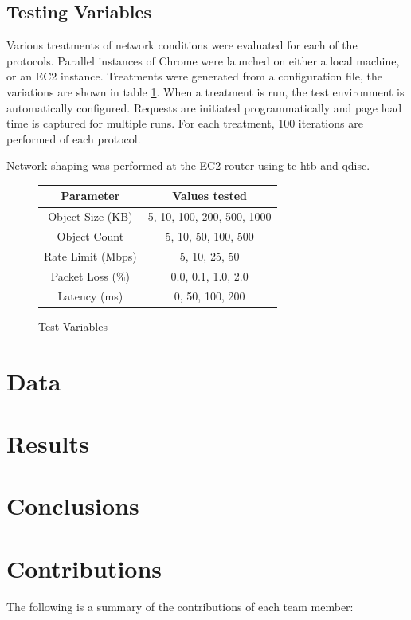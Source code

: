 \documentclass[12pt]{article}
\begin{document}
\subsection{Testing Variables}
Various treatments of network conditions were evaluated for each of the protocols. Parallel instances of Chrome were launched on either a local machine, or an EC2 instance. Treatments were generated from a configuration file, the variations are shown in table \ref{test_variables}. When a treatment is run, the test environment is automatically configured. Requests are initiated programmatically and page load time is captured for multiple runs. For each treatment, 100 iterations are performed of each protocol.

Network shaping was performed at the EC2 router using tc htb and qdisc.
\begin{figure}
\centering
\begin{tabular}{c|c}
	Parameter	&	Values tested 	\\\hline
	Object Size (KB)	&	5, 10, 100, 200, 500, 1000	\\
	Object Count &	5, 10, 50, 100, 500	\\
	Rate Limit (Mbps) 	&	5, 10, 25, 50	\\
	Packet Loss (\%)	&	0.0, 0.1, 1.0, 2.0	\\
	Latency (ms)		&	0, 50, 100, 200	\\
\end{tabular}
\caption{Test Variables}
\label{test_variables}
\end{figure}


\section{Data}
\label{data}

\section{Results}
\label{results}

\section{Conclusions}
\label{conclusions}

\appendix

\section{Contributions}
The following is a summary of the contributions of each team member:
\end{document}
